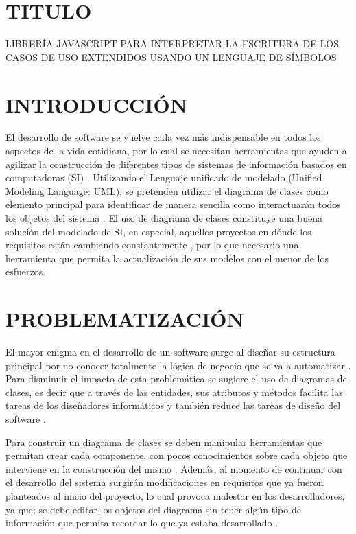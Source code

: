 \documentclass[12pt,a4paper,final]{article}
\begin{document}
	
	\section{TITULO}
	
	\par{LIBRERÍA JAVASCRIPT PARA INTERPRETAR LA ESCRITURA DE LOS CASOS DE USO EXTENDIDOS USANDO UN LENGUAJE DE SÍMBOLOS}
	
	\section{INTRODUCCIÓN}
	
	El desarrollo de software se vuelve cada vez más indispensable en todos los aspectos de la vida cotidiana, por lo cual se necesitan herramientas que ayuden a agilizar la construcción de diferentes tipos de sistemas de información basados en computadoras (SI) \cite{DeLone}. Utilizando el Lenguaje unificado de modelado (Unified Modeling Language: UML), se pretenden utilizar el diagrama de clases como elemento principal para identificar de manera sencilla como interactuarán todos los objetos del sistema \cite{UMLsequence}. El uso de diagrama de clases constituye una buena solución del modelado de SI, en especial, aquellos proyectos en dónde los requisitos están cambiando constantemente \cite{review}, por lo que necesario una herramienta que permita la actualización de sus modelos con el menor de los esfuerzos.
	
	\section{PROBLEMATIZACIÓN}
	
	El mayor enigma en el desarrollo de un software surge al diseñar su estructura principal por no conocer totalmente la lógica de negocio que se va a automatizar \cite{Weighted}.  Para disminuir el impacto de esta problemática se sugiere el uso de diagramas de clases, es decir que a través de las entidades, sus atributos y métodos facilita las tareas de los diseñadores informáticos y también reduce las tareas de diseño del software \cite{Management}.
	
	Para construir un diagrama de clases se deben manipular herramientas que permitan crear cada componente, con pocos conocimientos sobre cada objeto que interviene en la construcción del mismo \cite{Management}. Además, al momento de continuar con el desarrollo del sistema surgirán modificaciones en requisitos que ya fueron planteados al inicio del proyecto, lo cual provoca malestar en los desarrolladores, ya que; se debe editar los objetos del diagrama sin tener algún tipo de información que permita recordar lo que ya estaba desarrollado \cite{case}.
	
\end{document}
